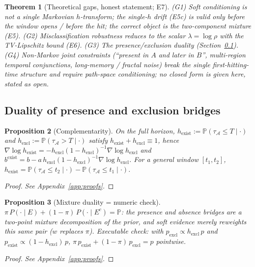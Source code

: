 \documentclass[11pt]{article}
\newtheorem{theorem}{Theorem}
\newtheorem{proposition}[theorem]{Proposition}
\newcommand{\Aregion}{\mathcal{A}}
\renewcommand{\P}[1]{\mathbb{P}\left(#1\right)}
\begin{document}
\begin{theorem}[Theoretical gaps, honest statement; E7]\label{thm:e7}
(G1) Soft conditioning is \emph{not} a single Markovian $h$-transform; the single-$h$
drift (E5c) is valid only before the window opens / before the hit; the correct object is
the two-component mixture (E5). (G2) Misclassification robustness reduces to the scalar
$\lambda=\log\rho$ with the TV-Lipschitz bound (E6). (G3) The presence/exclusion duality
(Section~\ref{sec:duality}). (G4) \emph{Non-Markov joint constraints} (``present in $A$ and
later in $B$'', multi-region temporal conjunctions, long-memory / fractal noise) break the
single first-hitting-time structure and require path-space conditioning; no closed form is
given here, stated as open.
\end{theorem}

\subsection{Duality of presence and exclusion bridges}
\label{sec:duality}
\begin{proposition}[Complementarity]\label{prop:dual}
On the full horizon, $h_{\mathrm{exist}}:=\P{\tau_{\Aregion}\le T\mid\cdot}$ and
$h_{\mathrm{excl}}:=\P{\tau_{\Aregion}>T\mid\cdot}$ satisfy
$h_{\mathrm{exist}}+h_{\mathrm{excl}}\equiv 1$, hence
$\nabla\log h_{\mathrm{exist}}=-h_{\mathrm{excl}}(1-h_{\mathrm{excl}})^{-1}\nabla\log
h_{\mathrm{excl}}$ and
$b^{\mathrm{exist}}=b-a\,h_{\mathrm{excl}}(1-h_{\mathrm{excl}})^{-1}\nabla\log
h_{\mathrm{excl}}$. For a general window $[t_1,t_2]$,
$h_{\mathrm{exist}}=\P{\tau_{\Aregion}\le t_2\mid\cdot}-\P{\tau_{\Aregion}\le t_1\mid\cdot}$.
\end{proposition}
\begin{proof}\emph{See Appendix~\ref{app:proofs}.}\end{proof}

\begin{proposition}[Mixture duality = numeric check]\label{prop:mixdual}
$\pi\,P(\cdot\mid E)+(1-\pi)\,P(\cdot\mid E^{c})=\mathbb{P}$: the presence and absence
bridges are a two-point mixture decomposition of the prior, and soft evidence merely
reweights this same pair ($w$ replaces $\pi$). Executable check: with
$p_{\mathrm{excl}}\propto h_{\mathrm{excl}}\,p$ and
$p_{\mathrm{exist}}\propto(1-h_{\mathrm{excl}})\,p$,
$\pi\,p_{\mathrm{exist}}+(1-\pi)\,p_{\mathrm{excl}}=p$ pointwise.
\end{proposition}
\begin{proof}\emph{See Appendix~\ref{app:proofs}.}\end{proof}
\end{document}
